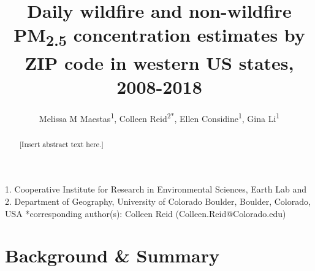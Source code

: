\documentclass[english]{article}
\begin{document}

\title{Daily wildfire and non-wildfire PM\textsubscript{2.5} concentration estimates by ZIP code in western US states, 2008-2018} 

\author{Melissa M Maestas\textsuperscript{1}, 
Colleen Reid\textsuperscript{2{*}},
Ellen Considine\textsuperscript{1},
Gina Li\textsuperscript{1}}

\maketitle
\thispagestyle{fancy}

1. Cooperative Institute for Research in
Environmental Sciences, Earth Lab and %
2. Department of Geography, University of Colorado Boulder,
Boulder, Colorado, USA 
{*}corresponding author(s): Colleen Reid (Colleen.Reid@Colorado.edu)

\begin{abstract}

[Insert abstract text here.]

\end{abstract}

\section*{Background \& Summary}

\end{document}
